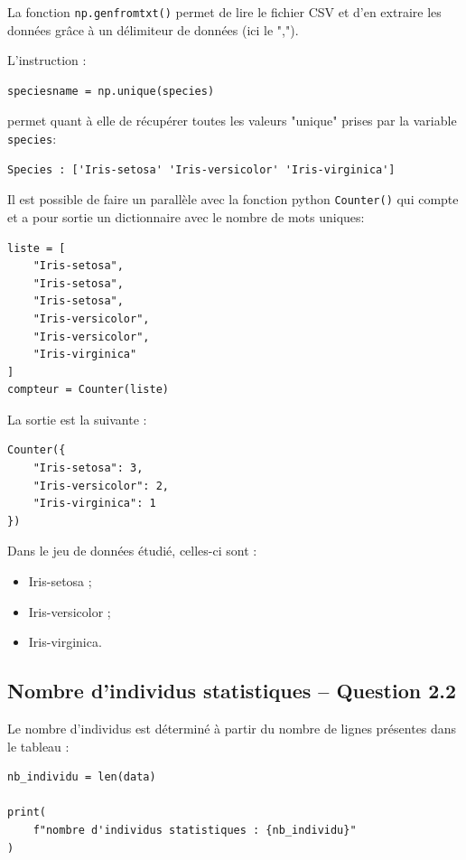 \documentclass[12pt,a4paper]{article}
\begin{document}
La fonction \texttt{np.genfromtxt()} permet de lire le fichier CSV et d'en extraire les données grâce à un délimiteur de données (ici le ",").

L'instruction :

\begin{lstlisting}
speciesname = np.unique(species)
\end{lstlisting}

permet quant à elle de récupérer toutes les valeurs "unique" prises
par la variable \texttt{species}:

\begin{lstlisting}
Species : ['Iris-setosa' 'Iris-versicolor' 'Iris-virginica']
\end{lstlisting}

Il est possible de faire un parallèle avec la fonction python \texttt{Counter()} qui compte et a pour sortie  un dictionnaire avec le nombre de mots uniques:
\begin{lstlisting}
liste = [
    "Iris-setosa",
    "Iris-setosa",
    "Iris-setosa",
    "Iris-versicolor",
    "Iris-versicolor",
    "Iris-virginica"
]
compteur = Counter(liste)
\end{lstlisting}
La sortie est la suivante :
\begin{lstlisting}
Counter({
    "Iris-setosa": 3,
    "Iris-versicolor": 2,
    "Iris-virginica": 1
})
\end{lstlisting}


Dans le jeu de données étudié, celles-ci sont :

\begin{itemize}
    \item Iris-setosa ;
    \item Iris-versicolor ;
    \item Iris-virginica.
\end{itemize}


\subsection{Nombre d'individus statistiques -- Question 2.2}

Le nombre d'individus est déterminé à partir du nombre de lignes
présentes dans le tableau :

\begin{lstlisting}
nb_individu = len(data)

print(
    f"nombre d'individus statistiques : {nb_individu}"
)
\end{lstlisting}
\end{document}
